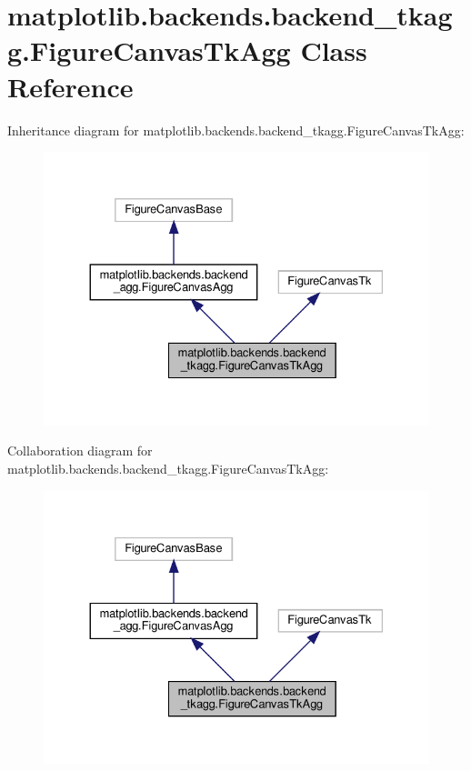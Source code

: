 \hypertarget{classmatplotlib_1_1backends_1_1backend__tkagg_1_1FigureCanvasTkAgg}{}\section{matplotlib.\+backends.\+backend\+\_\+tkagg.\+Figure\+Canvas\+Tk\+Agg Class Reference}
\label{classmatplotlib_1_1backends_1_1backend__tkagg_1_1FigureCanvasTkAgg}


Inheritance diagram for matplotlib.\+backends.\+backend\+\_\+tkagg.\+Figure\+Canvas\+Tk\+Agg\+:
\nopagebreak
\begin{figure}[H]
\begin{center}
\leavevmode
\includegraphics[width=330pt]{classmatplotlib_1_1backends_1_1backend__tkagg_1_1FigureCanvasTkAgg__inherit__graph}
\end{center}
\end{figure}


Collaboration diagram for matplotlib.\+backends.\+backend\+\_\+tkagg.\+Figure\+Canvas\+Tk\+Agg\+:
\nopagebreak
\begin{figure}[H]
\begin{center}
\leavevmode
\includegraphics[width=330pt]{classmatplotlib_1_1backends_1_1backend__tkagg_1_1FigureCanvasTkAgg__coll__graph}
\end{center}
\end{figure}
